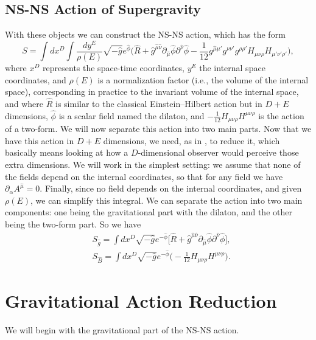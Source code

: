 \documentclass{article}
\begin{document}
\subsection{NS-NS Action of Supergravity}
With these objects we can construct the NS-NS action, which has the form
\begin{equation} \label{NS-NSaction}
    \boxed{S = \int d x^D \int \frac{d y ^E}{\rho(E)}\sqrt{- \hat g } e^{\hat \phi} \Big(\hat R +  \hat g^{\hat \mu \hat \nu}\partial_{\hat \mu}\hat \phi \partial^{\hat \nu}\hat \phi - \frac{1}{12} g^{ \hat \mu  \mu'} g^{\nu \nu'} g^{\rho \rho'} H_{ \mu \nu \rho}H_{ \mu'\nu' \rho'}\Big),}
\end{equation} 
where $x^D$ represents the space-time coordinates, $y^E$ the internal space coordinates, and $\rho(E)$ is a normalization factor (i.e., the volume of the internal space), corresponding in practice to the invariant volume of the internal space,
and where $\hat R$ is similar to the classical Einstein--Hilbert action but in $D+E$ dimensions, $\hat \phi$ is a scalar field named the dilaton, and $- \frac{1}{12} H_{ \mu \nu \rho}H^{ \mu\nu \rho}$ is the action of a two-form.
We will now separate this action into two main parts.
Now that we have this action in $D+E$ dimensions, we need, as in \cite{scherk1979get}, to reduce it, which basically means looking at how a $D$-dimensional observer
would perceive those extra dimensions. We will work in the simplest setting: we assume that none of the fields depend on the internal coordinates, so that for any field we have $\partial_\alpha A^{\hat \mu} = 0$.
Finally, since no field depends on the internal coordinates, and given $\rho(E)$, we can simplify this integral.
We can separate the action into two main components: one being the gravitational part with the dilaton, and the other being the two-form part. So we have
\begin{subequations}
    \begin{align}
        &S_{\hat g} = \int d x^D\sqrt{- \hat g } e^{-\hat \phi} \big[\hat R +\hat g^{\hat \mu \hat \nu}\partial_{\hat \mu}\hat \phi \partial^{\hat \nu}\hat \phi\big], \label{Sg}\\ 
        &S_{\hat B} =  \int d x^D \sqrt{- \hat g } e^{-\hat \phi} \Big(- \frac{1}{12} H_{ \mu \nu \rho}H^{ \mu\nu \rho}\Big). \label{SB}
    \end{align}
\end{subequations}
\clearpage
\section{Gravitational Action Reduction}
We will begin with the gravitational part of the NS-NS action.
\end{document}
